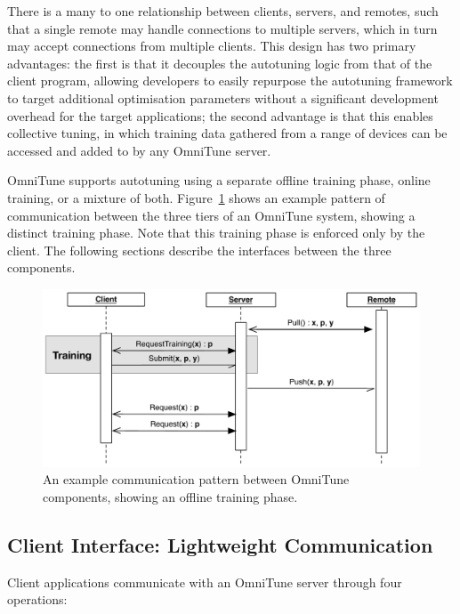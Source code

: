 There is a many to one relationship between clients, servers, and
remotes, such that a single remote may handle connections to multiple
servers, which in turn may accept connections from multiple
clients. This design has two primary advantages: the first is that it
decouples the autotuning logic from that of the client program,
allowing developers to easily repurpose the autotuning framework to
target additional optimisation parameters without a significant
development overhead for the target applications; the second advantage
is that this enables collective tuning, in which training data
gathered from a range of devices can be accessed and added to by any
OmniTune server.

OmniTune supports autotuning using a separate offline training phase,
online training, or a mixture of both. Figure~\ref{fig:omnitune-comms}
shows an example pattern of communication between the three tiers of
an OmniTune system, showing a distinct training phase. Note that this
training phase is enforced only by the client. The following sections
describe the interfaces between the three components.


\begin{figure}
\centering
\includegraphics[width=\textwidth]{img/omnitune-comms.pdf}
\caption{%
  An example communication pattern between OmniTune components,
  showing an offline training phase.%
}
\label{fig:omnitune-comms}
\end{figure}


\subsection{Client Interface: Lightweight Communication}

Client applications communicate with an OmniTune server through four
operations:

